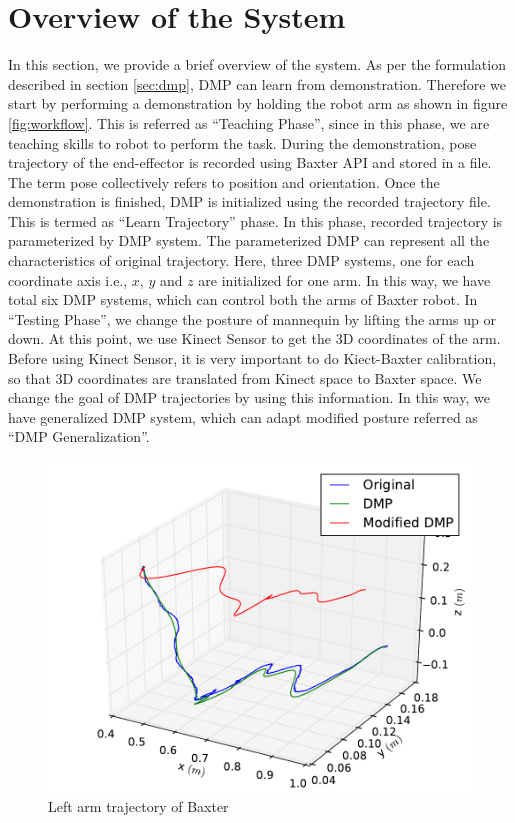 \documentclass[sigconf]{acmart}
\begin{document}
\section{Overview of the System}
\label{sec:system_overview}
In this section, we provide a brief overview of the system. As per the formulation described in section \ref{sec:dmp}, DMP can learn from demonstration. Therefore we start by performing a demonstration by holding the robot arm as shown in figure \ref{fig:workflow}. This is referred as ``Teaching Phase'', since in this phase, we are teaching skills to robot to perform the task.  During the demonstration, pose trajectory of the end-effector is recorded using Baxter API and stored in a file. The term pose collectively refers to position and orientation. Once the demonstration is finished, DMP is initialized using the recorded trajectory file. This is termed as ``Learn Trajectory'' phase. In this phase, recorded trajectory is parameterized by DMP system. The parameterized DMP can represent all the characteristics of original trajectory. Here, three DMP systems, one for each coordinate axis i.e., $x$, $y$ and $z$ are initialized for one arm. In this way, we have total six DMP systems, which can control both the arms of Baxter robot. In ``Testing Phase'', we change the posture of mannequin by lifting the arms up or down. At this point, we use Kinect Sensor to get the 3D coordinates of the arm. Before using Kinect Sensor, it is very important to do Kiect-Baxter calibration, so that 3D coordinates are translated from Kinect space to Baxter space. We change the goal of DMP trajectories by using this information. In this way, we have generalized DMP system, which can adapt modified posture referred as ``DMP Generalization''.

\begin{figure}
	\includegraphics[width=\linewidth]{all_traj}
	\caption{Left arm trajectory of Baxter}
	\label{fig:trajectory}
\end{figure}
\end{document}
